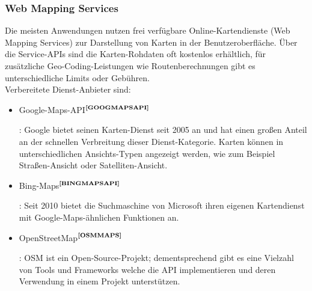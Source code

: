 \subsubsection{Web Mapping Services}
Die meisten Anwendungen nutzen frei verfügbare Online-Kartendienste (Web Mapping Services) zur Darstellung von Karten in der Benutzeroberfläche. Über die Service-APIs sind die Karten-Rohdaten
oft kostenlos erhältlich, für zusätzliche Geo-Coding-Leistungen wie Routenberechnungen gibt es unterschiedliche Limits oder Gebühren.\\
Verbereitete Dienst-Anbieter sind:
\begin{itemize}
  \item Google-Maps-API$^{\textbf{\ref{GOOGMAPSAPI}}}$%
\addtocounter{footnote}{1}%
:
Google bietet seinen Karten-Dienst seit 2005 an und hat einen großen Anteil an der schnellen Verbreitung
dieser Dienst-Kategorie. Karten können in unterschiedlichen Ansichts-Typen angezeigt werden, wie zum Beispiel Straßen-Ansicht oder Satelliten-Ansicht.
  \item Bing-Maps$^{\textbf{\ref{BINGMAPSAPI}}}$%
\addtocounter{footnote}{1}%
:
Seit 2010 bietet die Suchmaschine von Microsoft ihren eigenen Kartendienst mit Google-Maps-ähnlichen Funktionen an.
  \item OpenStreetMap$^{\textbf{\ref{OSMMAPS}}}$%
\addtocounter{footnote}{1}%
:
OSM ist ein Open-Source-Projekt; dementsprechend gibt es eine Vielzahl von Tools und Frameworks welche die API implementieren und deren Verwendung in einem Projekt unterstützen.
\end{itemize}


